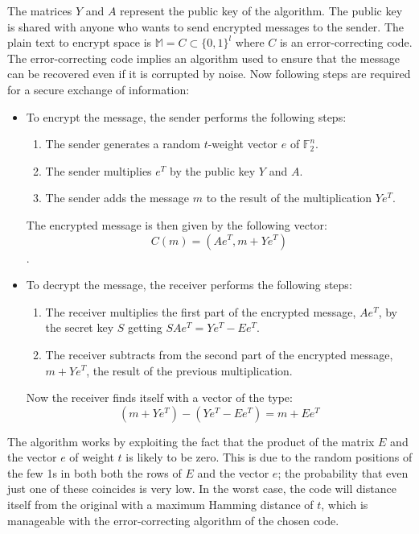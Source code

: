 The matrices $Y$ and $A$ represent the public key of the algorithm. The public key is shared with anyone who wants to send encrypted messages to the sender.
The plain text to encrypt space is $\mathbb{M} = C \subset \{0,1\}^l $ where $C$ is an error-correcting code. The error-correcting code implies an algorithm used to ensure that the message can be recovered even if it is corrupted by noise.
Now following steps are required for a secure exchange of information:
\begin{itemize}
 \item To encrypt the message, the sender performs the following steps:
    \begin{enumerate}
     \item The sender generates a random $t$-weight vector $e$ of $\mathbb{F}_2^n $.
     \item The sender multiplies $e^T$ by the public key $Y$ and $A$.
     \item The sender adds the message $m$ to the result of the multiplication $Ye^T$.
    \end{enumerate}
    The encrypted message is then given by the following vector: $$C(m) = (Ae^T, m+Ye^T)$$.
    \item To decrypt the message, the receiver performs the following steps:
    \begin{enumerate}
     \item The receiver multiplies the first part of the encrypted message, $Ae^T$, by the secret key $S$ getting $SAe^T = Ye^T-Ee^T $.
     \item The receiver subtracts from the second part of the encrypted message, $m+Ye^T$, the result of the previous multiplication.
    \end{enumerate}
    Now the receiver finds itself with a vector of the type: $$(m+Ye^T) - (Ye^T-Ee^T) = m + Ee^T$$
\end{itemize}
The algorithm works by exploiting the fact that the product of the matrix $E$ and the vector $e$ of weight $t$ is likely to be zero. This is due to the random positions of the few 1s in both both the rows of $E$ and the vector $e$; the probability that even just one of these coincides is very low.
In the worst case, the code will distance itself from the original with a maximum Hamming distance of $t$, which is manageable with the error-correcting algorithm of the chosen code.

